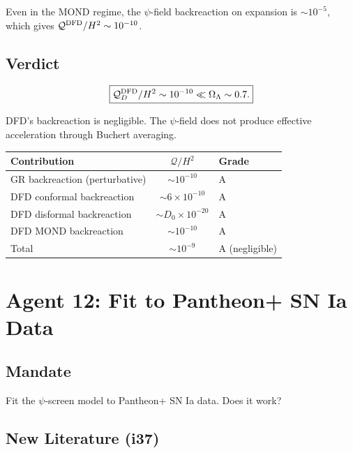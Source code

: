 \documentclass[11pt,a4paper]{article}
\begin{document}
Even in the MOND regime, the $\psi$-field backreaction on expansion is $\sim 10^{-5}$, which gives $\mathcal{Q}^{\rm DFD}/H^2 \sim 10^{-10}$.

\subsection{Verdict}

\begin{equation}
\boxed{\mathcal{Q}_D^{\rm DFD}/H^2 \sim 10^{-10} \ll \Omega_\Lambda \sim 0.7.}
\end{equation}

DFD's backreaction is negligible. The $\psi$-field does not produce effective acceleration through Buchert averaging.

\begin{center}
\begin{tabular}{lcl}
\toprule
\textbf{Contribution} & \textbf{$\mathcal{Q}/H^2$} & \textbf{Grade} \\
\midrule
GR backreaction (perturbative) & $\sim 10^{-10}$ & A \\
DFD conformal backreaction & $\sim 6 \times 10^{-10}$ & A \\
DFD disformal backreaction & $\sim D_0 \times 10^{-20}$ & A \\
DFD MOND backreaction & $\sim 10^{-10}$ & A \\
Total & $\sim 10^{-9}$ & A (negligible) \\
\bottomrule
\end{tabular}
\end{center}

\newpage
\section{Agent 12: Fit to Pantheon+ SN Ia Data}
\label{sec:agent12}

\subsection{Mandate}

Fit the $\psi$-screen model to Pantheon+ SN Ia data. Does it work?

\subsection{New Literature (i37)}
\end{document}
